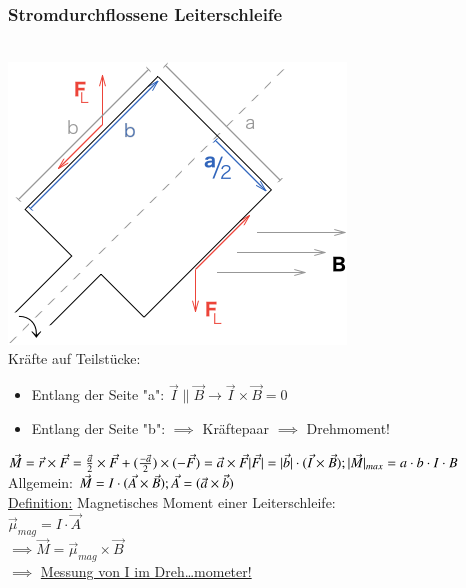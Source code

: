         \subsubsection{Stromdurchflossene Leiterschleife}\leavevmode \\
        
        \includegraphics{skizzen/16/16_1B09}\\
        
        Kräfte auf Teilstücke:\\
        \begin{itemize}
        	\item Entlang der Seite "a": $\vec{I}\parallel\vec{B}\rightarrow \vec{I}\times\vec{B}=0 $\\
        	\item Entlang der Seite "b": $\implies$ Kräftepaar $\implies$ Drehmoment!
        \end{itemize}
        
        $\vec{M}=\vec{r}\times\vec{F}=\frac{\vec{a}}{2}\times\vec{F}+(\frac{-\vec{a}}{2})\times(-\vec{F})=\vec{a}\times\vec{F}\\
        \vert\vec{F}\vert=\vert\vec{b}\vert\cdot(\vec{I}\times\vec{B});\hfil \vert\vec{M}\vert_{max}=a\cdot b\cdot I\cdot B$\\
        
        Allgemein: $\vec{M}=I\cdot(\vec{A}\times\vec{B});\hfil \vec{A}=(\vec{a}\times\vec{b})$\\
        
        \underline{Definition:} Magnetisches Moment einer Leiterschleife:\\
        $\boxed{\vec{\mu}_{mag}=I\cdot\vec{A}}$\\
        $ \implies\boxed{\vec{M}=\vec{\mu}_{mag}\times\vec{B}} $\\
        
        $\implies$ \underline{Messung von I im Dreh…mometer!}
        
        
        
        
        
        
        
        
        
        
        
        
        
        
        
\newpage  